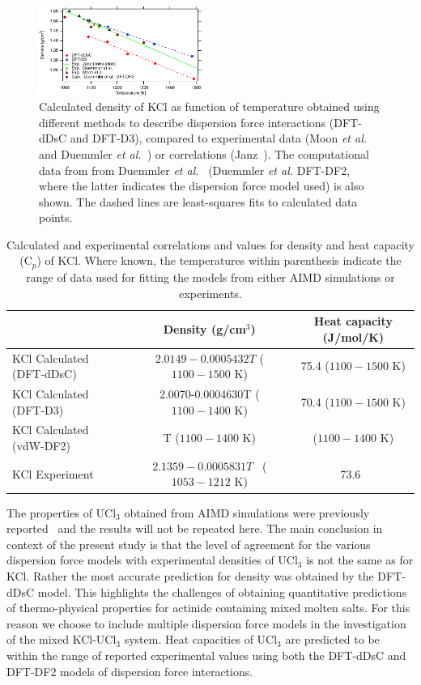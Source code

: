 \documentclass[preprint,3p,10pt,twocolumn,number,sort&compress]{elsarticle}
\begin{document}
\begin{figure}[htb]
\centering
\includegraphics[width=0.49\textwidth]{KCl.pdf}
\caption{Calculated density of KCl as function of temperature obtained using different methods to describe dispersion force interactions (DFT-dDsC and DFT-D3), compared to experimental data (Moon \textit{et al.}~\cite{Moon} and Duemmler \textit{et al.}~\cite{DUEMMLER2022153414}) or correlations (Janz~\cite{Janz1988}). The computational data from 
from Duemmler \textit{et al.}~\cite{DUEMMLER2022153414} (Duemmler \textit{et al.} DFT-DF2, where the latter indicates the dispersion force model used) is also shown. The dashed lines are least-squares fits to calculated data points.} 
\label{fig:KCl}
\end{figure}

\begin{table}[hb!]
\centering
\begin{tabular}{lcc}
\hline
\hline
& Density (g/cm$^3$) &Heat capacity (J/mol/K) \\
\hline
KCl Calculated (DFT-dDsC)	&$2.0149-0.0005432T$ ($1100 - 1500$ K) &75.4 ($1100 - 1500$ K)\\
KCl Calculated (DFT-D3)	&2.0070-0.0004630T ($1100 - 1400$ K)& 70.4 ($1100 - 1500$ K)\\
KCl Calculated (vdW-DF2)	& T ($1100 - 1400$ K)& ($1100 - 1400$ K)\\
KCl Experiment	&$2.1359-0.0005831 T$~\cite{Janz1988} ($1053-1212$ K) &73.6~\cite{NIST} \\	
\hline
\hline
\end{tabular}
\caption{Calculated and experimental correlations and values for density and heat capacity (C$_p$) of KCl. Where known, the temperatures within parenthesis indicate the range of data used for fitting the models from either AIMD simulations or experiments.}
\label{table:KCldensityetc}
\end{table}

The properties of UCl$_3$ obtained from AIMD simulations were previously reported~\cite{Andersson} and the results will not be repeated here. The main conclusion in context of the present study is that the level of agreement for the various dispersion force models with experimental densities of UCl$_3$ is not the same as for KCl. Rather the most accurate prediction for density was obtained by the DFT-dDsC model. 
This highlights the challenges of obtaining quantitative predictions of thermo-physical properties for actinide containing mixed molten salts. For this reason we choose to include multiple dispersion force models in the investigation of the mixed KCl-UCl$_3$ system. 
Heat capacities of UCl$_3$ are predicted to be within the range of reported experimental values using both the DFT-dDsC and DFT-DF2 models of dispersion force interactions.
\end{document}
